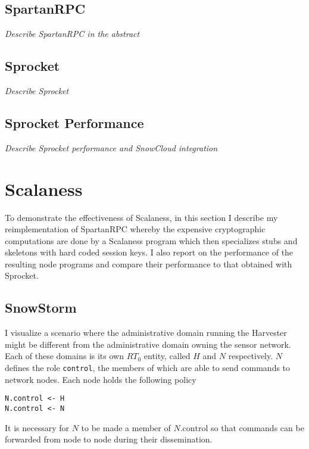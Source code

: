 \subsection{SpartanRPC}

\textit{Describe SpartanRPC in the abstract}

\subsection{Sprocket}

\textit{Describe Sprocket}

\subsection{Sprocket Performance}

\textit{Describe Sprocket performance and SnowCloud integration}

\section{Scalaness}

To demonstrate the effectiveness of Scalaness, in this section I describe my reimplementation of
SpartanRPC whereby the expensive cryptographic computations are done by a Scalaness program
which then specializes stubs and skeletons with hard coded session keys. I also report on the
performance of the resulting node programs and compare their performance to that obtained with
Sprocket.

\subsection{SnowStorm}

I visualize a scenario where the administrative domain running the Harvester might be different
from the administrative domain owning the sensor network. Each of these domains is its own
$RT_0$ entity, called $H$ and $N$ respectively. $N$ defines the role \texttt{control}, the
members of which are able to send commands to network nodes. Each node holds the following
policy
\begin{Verbatim}
N.control <- H
N.control <- N
\end{Verbatim}

It is necessary for $N$ to be made a member of $N.\textrm{control}$ so that commands can be
forwarded from node to node during their dissemination. 

